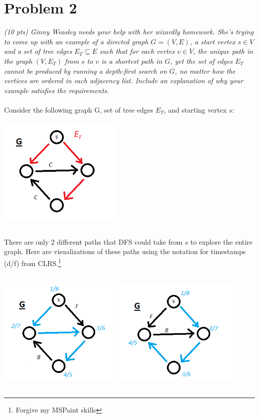 \documentclass[12pt]{article} \setlength{\oddsidemargin}{0in}
\begin{document}
\newpage

\section*{Problem 2}

\textit{(10 pts) Ginny Weasley needs your help with her wizardly
  homework. She’s trying to come up with an example of a directed
  graph $G = (V, E)$, a start vertex $s \in V$ and a set of tree edges
  $E_T \subseteq E$ such that for each vertex $v \in V$, the unique path in the
  graph $(V, E_T)$ from $s$ to $v$ is a shortest path in $G$, yet the
  set of edges $E_T$ cannot be produced by running a depth-first
  search on $G$, no matter how the vertices are ordered in each
  adjacency list. Include an explanation of why your example satisfies
  the requirements.} \\\\
Consider the following graph G, set of tree edges $E_T$, and starting vertex $s$:\\
  \includegraphics[width=6cm,height=6cm]{2-G-ET}

  There are only 2 different paths that DFS could take from $s$ to explore the entire graph.
  Here are visualizations of these paths using the notation for timestamps (d/f) from CLRS.\footnote{Forgive my MSPaint skills}

  \includegraphics[width=6cm,height=6cm]{2-G-P1} \includegraphics[width=6cm,height=6cm]{2-G-P2} 
\end{document}
